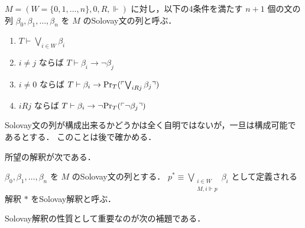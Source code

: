\documentclass{jlreq}
\begin{document}
\begin{definition}
	$M = (W = \{0,1,\dots,n\}, 0, R, \Vdash)$ に対し，以下の4条件を満たす $n + 1$ 個の文の列 $\beta_0, \beta_1, \dots, \beta_n$ を $M$ のSolovay文の列と呼ぶ．
	\begin{enumerate}
		\item $T \vdash \bigvee_{i \in W} \beta_i$
		\item $i \neq j$ ならば $T \vdash \beta_i \to \lnot \beta_j$
		\item $i \neq 0$ ならば $T \vdash \beta_i \to \mathrm{Pr}_T(\ulcorner \bigvee_{i R j} \beta_j \urcorner)$
		\item $i R j$ ならば $T \vdash \beta_i \to \lnot \mathrm{Pr}_T(\ulcorner \lnot \beta_j \urcorner)$
	\end{enumerate}
\end{definition}

\begin{remark}
	Solovay文の列が構成出来るかどうかは全く自明ではないが，一旦は構成可能であるとする．
	このことは後で確かめる．
\end{remark}

所望の解釈が次である．

\begin{definition}
	$\beta_0, \beta_1, \dots, \beta_n$ を $M$ のSolovay文の列とする．
	$p^* \equiv \bigvee_{\substack{i \in W \\ M, i \Vdash p}} \beta_i$ として定義される解釈 $*$ をSolovay解釈と呼ぶ．
\end{definition}

Solovay解釈の性質として重要なのが次の補題である．
\end{document}
